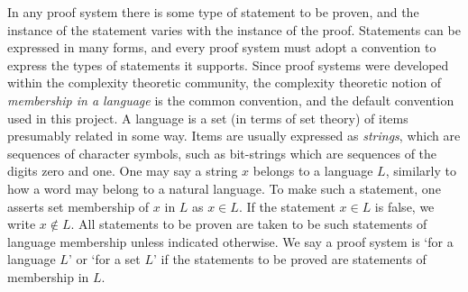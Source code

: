 \begin{remark}
    
    In any proof system there is some type of statement to be proven, and the instance of the statement varies with the instance of the proof.
    Statements can be expressed in many forms, and every proof system must adopt a convention to express the types of statements it supports.
    Since proof systems were developed within the complexity theoretic community, the complexity theoretic notion of \emph{membership in a language} is the common convention, and the default convention used in this project.
    A language is a set (in terms of set theory) of items presumably related in some way.
    Items are usually expressed as \emph{strings}, which are sequences of character symbols, such as bit-strings which are sequences of the digits zero and one.
    One may say a string $x$ belongs to a language $L$, similarly to how a word may belong to a natural language.
    To make such a statement, one asserts set membership of $x$ in $L$ as $x\in L$.
    If the statement $x\in L$ is false, we write $x\notin L$.
    All statements to be proven are taken to be such statements of language membership unless indicated otherwise.
    We say a proof system is `for a language $L$' or `for a set $L$' if the statements to be proved are statements of membership in $L$.
\end{remark}

